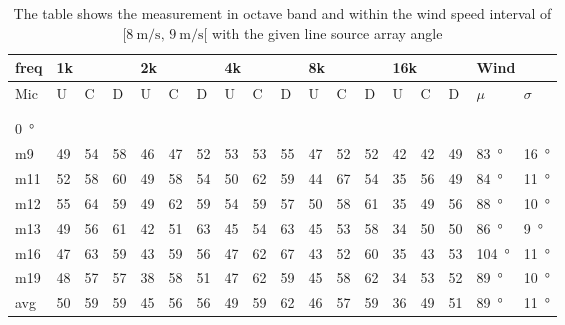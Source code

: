 \begin{table}[H]
\centering
\caption{The table shows the measurement in octave band and within the wind speed interval of $[\SI{8}{\meter\per\second},\, \SI{9}{\meter\per\second}[ $ with the given line source array angle}
\setlength\tabcolsep{5pt} %
\begin{tabular}{l|l|l|l|l|l|l|l|l|l|l|l|l|l|l|l|l|l}
freq & \multicolumn{3}{l|}{1k} & \multicolumn{3}{l|}{2k} & \multicolumn{3}{l|}{4k} & \multicolumn{3}{l|}{8k} & \multicolumn{3}{l|}{16k}   &  \multicolumn{2}{l}{Wind}                      \\ \hline
Mic  & U      & C      & D     & U      & C      & D     & U      & C      & D     & U      & C      & D     & U  & C  & D & $\mu$ & $\sigma$ \\ \hline
 & \multicolumn{3}{l|}{} & \multicolumn{3}{l|}{} & \multicolumn{3}{l|}{} & \multicolumn{3}{l|}{} & \multicolumn{3}{l|}{} &      \multicolumn{2}{l}{}                        \\ 
 \multicolumn{18}{l}{ } \\  
\SI{0}{\degree}   & \multicolumn{3}{l|}{} & \multicolumn{3}{l|}{} & \multicolumn{3}{l|}{} & \multicolumn{3}{l|}{} & \multicolumn{3}{l|}{} & \multicolumn{2}{l}{}   \\  \hline
m9   & 49     & 54     & 58    & 46     & 47     & 52    & 53     & 53     & 55    & 47     & 52     & 52    & 42 & 42 & 49  & \SI{83}{\degree} & \SI{16}{\degree}  \\
m11  & 52     & 58     & 60    & 49     & 58     & 54    & 50     & 62     & 59    & 44     & 67     & 54    & 35 & 56 & 49   & \SI{84}{\degree} & \SI{11}{\degree}  \\
m12  & 55     & 64     & 59    & 49     & 62     & 59    & 54     & 59     & 57    & 50     & 58     & 61    & 35 & 49 & 56   & \SI{88}{\degree} & \SI{10}{\degree}  \\
m13  & 49     & 56     & 61    & 42     & 51     & 63    & 45     & 54     & 63    & 45     & 53     & 58    & 34 & 50 & 50   & \SI{86}{\degree} & \SI{9}{\degree}  \\
m16  & 47     & 63     & 59    & 43     & 59     & 56    & 47     & 62     & 67    & 43     & 52     & 60    & 35 & 43 & 53   & \SI{104}{\degree} & \SI{11}{\degree}  \\
m19  & 48     & 57     & 57    & 38     & 58     & 51    & 47     & 62     & 59    & 45     & 58     & 62    & 34 & 53 & 52   & \SI{89}{\degree} & \SI{10}{\degree}  \\ \hline
avg  &  50    &  59    & 59    &  45     &  56    &  56   & 49     & 59     & 62    & 46     & 57     & 59    & 36   & 49   & 51   & \SI{89}{\degree} & \SI{11}{\degree}  \\ \hline  

\end{tabular}
\end{table}
